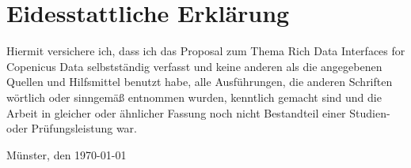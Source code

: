\newpage
\thispagestyle{empty}
\section*{Eidesstattliche Erklärung}	%
\vspace{1cm}

Hiermit versichere ich, dass ich das Proposal zum Thema Rich Data Interfaces for Copenicus Data selbstständig verfasst und keine anderen als die angegebenen Quellen und Hilfsmittel benutzt habe, alle Ausführungen, die anderen Schriften wörtlich oder sinngemäß entnommen wurden, kenntlich gemacht sind und die Arbeit in gleicher oder ähnlicher Fassung noch nicht Bestandteil einer Studien- oder Prüfungsleistung war. 

\vspace{3cm}

Münster, den \today
